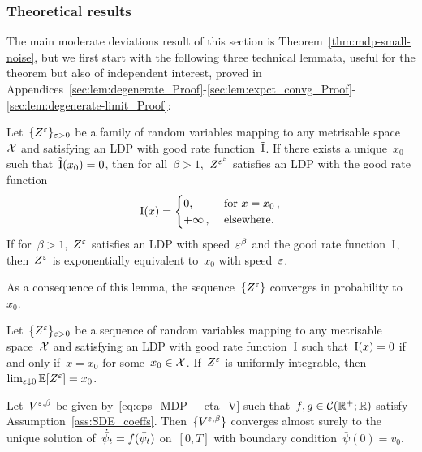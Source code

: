 \subsubsection{Theoretical results}
The main moderate deviations result of this section is Theorem~\ref{thm:mdp-small-noise}, 
but we first start with the following three technical lemmata,
useful for the theorem but also of independent interest, proved in Appendices~\ref{sec:lem:degenerate_Proof}-\ref{sec:lem:expct_convg_Proof}-\ref{sec:lem:degenerate-limit_Proof}:
\begin{lemma}\label{lem:degenerate}
Let~$\{Z^{\varepsilon}\}_{\varepsilon>0}$ be a family of random variables mapping to any metrisable space~$\mathcal{X}$ and satisfying an LDP with good rate function~$\tilde{\mathrm{I}}$.
If there exists a unique~$x_0$ such that~$\tilde{\mathrm{I}}(x_0) = 0$, 
then for all~$\beta > 1$,~$Z^{\varepsilon^\beta}$ satisfies an LDP with the good rate function
\[ 
\mathrm{I}(x)=
\begin{cases} 
      0, & \text{ for } x=x_0\,, \\
      +\infty\,, & \text{ elsewhere.}
\end{cases}
\]
If for~$\beta > 1$,~$Z^{\varepsilon}$ satisfies an LDP with speed~$\varepsilon^{\beta}$ and the good rate function~$\mathrm{I}$, then~$Z^{\varepsilon}$ is exponentially equivalent to~$x_0$ with speed~$\varepsilon$.
\end{lemma}

As a consequence of this lemma, the sequence~$\{Z^{\varepsilon}\}$ converges in probability to~$x_0$. 

\begin{lemma}\label{lem:expct_convg}
Let~$\{Z^{\varepsilon}\}_{\varepsilon>0}$ be a sequence of random variables mapping to any metrisable space~$\mathcal{X}$ and satisfying an LDP with good rate function~$\mathrm{I}$ such that~$\mathrm{I}(x)=0$ if and only if~$x = x_0$ for some~$x_0 \in\mathcal{X}$. 
If~$Z^{\varepsilon}$ is uniformly integrable, then~$\lim_{\varepsilon\downarrow 0}\mathbb{E}[Z^{\varepsilon}] = x_0$.
\end{lemma}

\begin{lemma}\label{lem:degenerate-limit}
Let~$V^{\varepsilon,\beta}$ be given by~\eqref{eq:eps_MDP__eta_V} such that~$f, g\in\mathcal{C}(\mathbb{R}^+; \mathbb{R})$  satisfy Assumption~\ref{ass:SDE_coeffs}. Then~$\{V^{\varepsilon,\beta}\}$ converges almost surely to the unique solution of~$\dot{\bar\psi}_t =\nobreak f(\bar\psi_t)$ on~$[0,T]$ with boundary condition~$\bar\psi(0) = v_0$.
\end{lemma}


